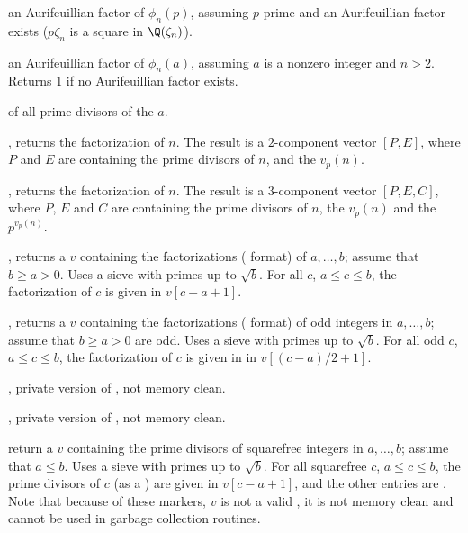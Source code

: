  an Aurifeuillian factor
of $\phi_n(p)$, assuming $p$ prime and an Aurifeuillian factor exists
($p \zeta_n$ is a square in $\Q(\zeta_n)$).

 an Aurifeuillian factor of
$\phi_n(a)$, assuming $a$ is a nonzero integer and $n > 2$. Returns $1$
if no Aurifeuillian factor exists.

  of all prime divisors of the
 $a$.

, returns the factorization of $n$. The result
is a $2$-component vector $[P,E]$, where $P$ and $E$ are 
containing the prime divisors of $n$, and the $v_p(n)$.

, returns the factorization of $n$. The result
is a $3$-component vector $[P,E,C]$, where $P$, $E$ and $C$ are
 containing the prime divisors of $n$, the $v_p(n)$
and the $p^{v_p(n)}$.

, returns a  $v$ containing
the factorizations ( format) of $a,\dots, b$; assume that $b
\geq a > 0$. Uses a sieve with primes up to $\sqrt{b}$. For all
$c$, $a \leq c \leq b$, the factorization of $c$ is given in $v[c-a+1]$.

, returns a  $v$ containing
the factorizations ( format) of odd integers in $a,\dots, b$;
assume that $b \geq a > 0$ are odd. Uses a sieve with primes up to
$\sqrt{b}$. For all odd $c$, $a \leq c \leq b$, the factorization of $c$ is
given in in $v[(c-a)/2 + 1]$.

, private version of
, not memory clean.

, private version of
, not memory clean.

 return a  $v$
containing the prime divisors of squarefree integers in $a,\dots,b$; assume
that $a \leq b$. Uses a sieve with primes up to $\sqrt{b}$.
For all squarefree $c$, $a\leq c\leq b$, the prime divisors of $c$ (as a
) are given in $v[c-a+1]$, and the other entries are
. Note that because of these  markers, $v$ is not a valid
, it is not memory clean and cannot be used in garbage collection
routines.


